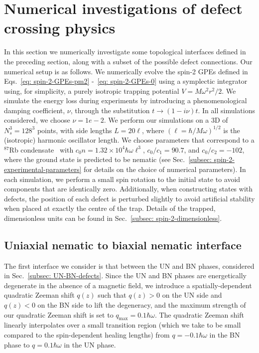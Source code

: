 \section{Numerical investigations of defect crossing physics}
In this section we numerically investigate some topological interfaces defined
in the preceding section, along with a subset of the possible defect
connections.
Our numerical setup is as follows.
We numerically evolve the spin-2 GPEs defined in
Eqs.~\eqref{eq: spin-2-GPEs-pm2} -~\eqref{eq: spin-2-GPEs-0} using a symplectic
integrator~\cite{Symes2017} using, for simplicity, a purely isotropic trapping
potential \(V=M\omega^2r^2/2\).
We simulate the energy loss during experiments by introducing a phenomenological
damping coefficient, \(\nu \), through the substitution
\(t \rightarrow (1-i\nu)t\).
In all simulations considered, we choose \(\nu = 1e-2\).
We perform our simulations on a 3D of \(N_s^3=128^3\) points, with side lengths
\(L = 20\ell \), where \({(\ell =\hbar/M\omega)}^{1/2}\) is the (isotropic)
harmonic oscillator length.
We choose parameters that correspond to a \(^{87}\)Rb
condensate~\cite{Klausen2001} with \(c_0n=1.32\times10^4\hbar\omega\ell^3\),
\(c_0/c_1=90.7\), and \(c_0/c_2=-102\), where the ground state is predicted to
be nematic (see Sec.~\ref{subsec: spin-2-experimental-parameters} for details
on the choice of numerical parameters).
In each simulation, we perform a small spin rotation to the initial state to
avoid components that are identically zero.
Additionally, when constructing states with defects, the position of each defect
is perturbed slightly to avoid artificial stability when placed at exactly the
centre of the trap.
Details of the trapped, dimensionless units can be found in
Sec.~\ref{subsec: spin-2-dimensionless}.

\subsection{\label{subsec: UN-BN-numerics}
Uniaxial nematic to biaxial nematic interface}
The first interface we consider is that between the UN and BN phases, considered
in Sec.~\ref{subsec: UN-BN-defects}.
Since the UN and BN phases are energetically degenerate in the absence of a
magnetic field, we introduce a spatially-dependent quadratic Zeeman shift
\(q(z)\) such that \(q(z) > 0\) on the UN side and \(q(z) < 0\) on the BN side
to lift the degeneracy, and the maximum strength of our quadratic Zeeman shift
is set to \(q_\text{max} = 0.1\hbar\omega \).
The quadratic Zeeman shift linearly interpolates over a small transition region
(which we take to be small compared to the spin-dependent healing lengths) from
\(q = -0.1\hbar\omega \) in the BN phase to \(q = 0.1\hbar\omega \) in the UN
phase.

